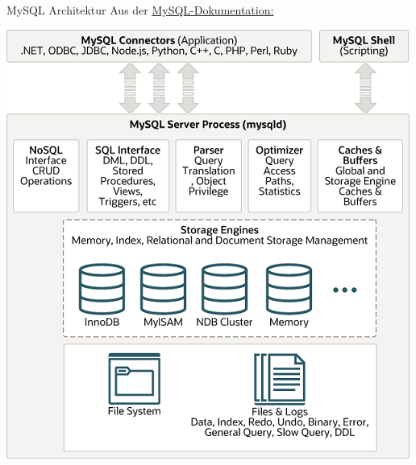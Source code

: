\begin{example}{MySQL Architektur}
    Aus der \href{https://dev.mysql.com/doc/refman/8.0/en/pluggable-storage-overview.html#mysql-architecture-diagram}{MySQL-Dokumentation:}
    \begin{center}
        \includegraphics[width=0.7\linewidth]{includes/figures/mysql-architecture.png}
    \end{center}
\end{example}
